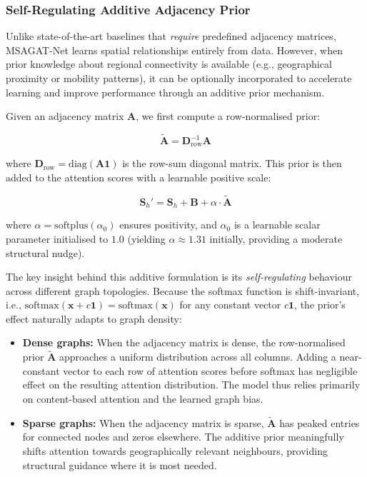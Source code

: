\documentclass[a4paper,fleqn]{cas-dc}
\begin{document}
\subsubsection{Self-Regulating Additive Adjacency Prior}
\label{sec:adj_prior}

Unlike state-of-the-art baselines that \emph{require} predefined adjacency matrices, MSAGAT-Net learns spatial relationships entirely from data. However, when prior knowledge about regional connectivity is available (e.g., geographical proximity or mobility patterns), it can be optionally incorporated to accelerate learning and improve performance through an additive prior mechanism.

Given an adjacency matrix $\mathbf{A}$, we first compute a row-normalised prior:

\begin{equation}
\tilde{\mathbf{A}} = \mathbf{D}_{\text{row}}^{-1}\mathbf{A}
\end{equation}

where $\mathbf{D}_{\text{row}} = \text{diag}(\mathbf{A}\mathbf{1})$ is the row-sum diagonal matrix. This prior is then added to the attention scores with a learnable positive scale:

\begin{equation}
\mathbf{S}_h' = \mathbf{S}_h + \mathbf{B} + \alpha \cdot \tilde{\mathbf{A}}
\end{equation}

where $\alpha = \text{softplus}(\alpha_0)$ ensures positivity, and $\alpha_0$ is a learnable scalar parameter initialised to $1.0$ (yielding $\alpha \approx 1.31$ initially, providing a moderate structural nudge).

The key insight behind this additive formulation is its \emph{self-regulating} behaviour across different graph topologies. Because the softmax function is shift-invariant, i.e., $\text{softmax}(\mathbf{x} + c\mathbf{1}) = \text{softmax}(\mathbf{x})$ for any constant vector $c\mathbf{1}$, the prior's effect naturally adapts to graph density:

\begin{itemize}
    \item \textbf{Dense graphs:} When the adjacency matrix is dense, the row-normalised prior $\tilde{\mathbf{A}}$ approaches a uniform distribution across all columns. Adding a near-constant vector to each row of attention scores before softmax has negligible effect on the resulting attention distribution. The model thus relies primarily on content-based attention and the learned graph bias.
    \item \textbf{Sparse graphs:} When the adjacency matrix is sparse, $\tilde{\mathbf{A}}$ has peaked entries for connected nodes and zeros elsewhere. The additive prior meaningfully shifts attention towards geographically relevant neighbours, providing structural guidance where it is most needed.
\end{itemize}
\end{document}
